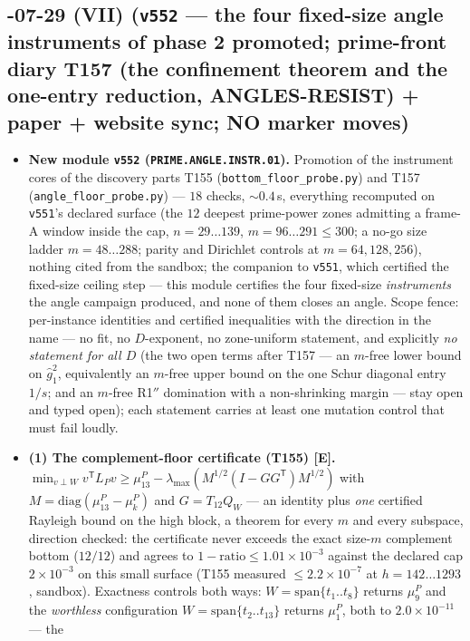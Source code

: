 \documentclass[11pt]{article}
\providecommand{\mE}{\textbf{[E]}}\providecommand{\mC}{\textbf{[C]}}
\begin{document}
\subsection*{-07-29 (VII) (\texttt{v552} --- the four fixed-size angle instruments of phase 2 promoted; prime-front diary T157 (the confinement theorem and the one-entry reduction, ANGLES-RESIST) + paper + website sync; NO marker moves)}
\begin{itemize}[leftmargin=1.5em]
\item \textbf{New module \texttt{v552} (\texttt{PRIME.ANGLE.INSTR.01}).} Promotion of the
instrument cores of the discovery parts T155 (\texttt{bottom\_floor\_probe.py}) and T157
(\texttt{angle\_floor\_probe.py}) --- $18$ checks, ${\sim}0.4$\,s, everything recomputed on
\texttt{v551}'s declared surface (the $12$ deepest prime-power zones admitting a frame-A
window inside the cap, $n=29\ldots139$, $m=96\ldots291\le300$; a no-go size ladder
$m=48\ldots288$; parity and Dirichlet controls at $m=64,128,256$), nothing cited from the
sandbox; the companion to \texttt{v551}, which certified the fixed-size ceiling step ---
this module certifies the four fixed-size \emph{instruments} the angle campaign produced,
and none of them closes an angle. Scope fence: per-instance identities and certified
inequalities with the direction in the name --- no fit, no $D$-exponent, no zone-uniform
statement, and explicitly \emph{no statement for all $D$} (the two open terms after T157
--- an $m$-free lower bound on $\hat g_1^2$, equivalently an $m$-free upper bound on the
one Schur diagonal entry $1/s$; and an $m$-free R1$''$ domination with a non-shrinking
margin --- stay open and typed open); each statement carries at least one mutation control
that must fail loudly.
\item \textbf{(1) The complement-floor certificate (T155) \mE.}
$\min_{v\perp W}v^{\mathsf T}L_Pv\ge\mu^P_{13}-\lambda_{\max}(M^{1/2}(I-GG^{\mathsf T})
M^{1/2})$ with $M=\mathrm{diag}(\mu^P_{13}-\mu^P_k)$ and $G=T_{12}Q_W$ --- an identity
plus \emph{one} certified Rayleigh bound on the high block, a theorem for every $m$ and
every subspace, direction checked: the certificate never exceeds the exact size-$m$
complement bottom ($12/12$) and agrees to $1-\mathrm{ratio}\le1.01\times10^{-3}$ against
the declared cap $2\times10^{-3}$ on this small surface (T155 measured
$\le2.2\times10^{-7}$ at $h=142\ldots1293$, sandbox). Exactness controls both ways:
$W=\mathrm{span}\{t_1..t_8\}$ returns $\mu^P_9$ and the \emph{worthless} configuration
$W=\mathrm{span}\{t_2..t_{13}\}$ returns $\mu^P_1$, both to $2.0\times10^{-11}$ --- the

\end{itemize}
\end{document}
